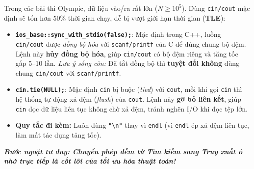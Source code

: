 \documentclass[11pt,a4paper]{article}
\begin{document}
\vspace{-0.15cm}
\begin{tcolorbox}[colback=AsianLightBlue!40,colframe=AsianBlue,arc=1.2mm,title=\textbf{\small BÍ KÍP PHÒNG THI: GIẢI THÍCH BỘ ĐÔI TĂNG TỐC VÀO/RA (FAST I/O)}]
\footnotesize
Trong các bài thi Olympic, dữ liệu vào/ra rất lớn ($N \ge 10^5$). Dùng \texttt{cin/cout} mặc định sẽ tốn hơn 50\% thời gian chạy, dễ bị vượt giới hạn thời gian (\textbf{TLE}):
\begin{itemize}
    \setlength{\itemsep}{1pt}
    \item \texttt{\textbf{ios\_base::sync\_with\_stdio(false);}}: Mặc định trong C++, luồng \texttt{cin/cout} được \textit{đồng bộ hóa} với \texttt{scanf/printf} của C để dùng chung bộ đệm. Lệnh này \textbf{hủy đồng bộ hóa}, giúp \texttt{cin/cout} có bộ đệm riêng và tăng tốc gấp 5--10 lần. \textit{Lưu ý sống còn:} Đã tắt đồng bộ thì \textbf{tuyệt đối không} dùng chung \texttt{cin/cout} với \texttt{scanf/printf}.
    \item \texttt{\textbf{cin.tie(NULL);}}: Mặc định \texttt{cin} bị buộc (\textit{tied}) với \texttt{cout}, mỗi khi gọi \texttt{cin} thì hệ thống tự động xả đệm (\textit{flush}) của \texttt{cout}. Lệnh này \textbf{gỡ bỏ liên kết}, giúp \texttt{cin} đọc dữ liệu liên tục không chờ xả đệm, tránh nghẽn I/O khi đọc tệp lớn.
    \item \textbf{Quy tắc đi kèm:} Luôn dùng \texttt{"\textbackslash n"} thay vì \texttt{endl} (vì \texttt{endl} ép xả đệm liên tục, làm mất tác dụng tăng tốc).
\end{itemize}
\end{tcolorbox}

\vspace{-0.05cm}
\begin{center}
    \textit{\color{AsianDarkBlue}\small\textbf{Bước ngoặt tư duy: Chuyển phép đếm từ Tìm kiếm sang Truy xuất ô nhớ trực tiếp là cốt lõi của tối ưu hóa thuật toán!}}
\end{center}
\end{document}
